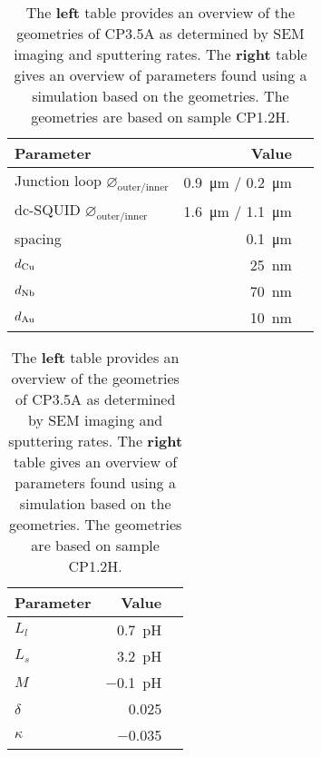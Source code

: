 \begin{table}
	\begin{subtable}{.6\linewidth}
		\begin{tabular}[t]{@{}lrr@{}}
			\toprule
			Parameter & Value \\ \midrule
			Junction loop $\diameter_{\text{outer/inner}}$ & \qty{0.9}{\micro\meter} / \qty{0.2}{\micro\meter} \\
			dc-SQUID $\diameter_{\text{outer/inner}}$ & \qty{1.6}{\micro\meter} / \qty{1.1}{\micro\meter} \\
			spacing & \qty{0.1}{\micro\meter} \\
			$d_{\ce{Cu}}$ & \qty{25}{\nano\meter} \\
			$d_{\ce{Nb}}$ & \qty{70}{\nano\meter} \\
			$d_{\ce{Au}}$ & \qty{10}{\nano\meter} \\
			\bottomrule
		\end{tabular}
    \end{subtable}
    \hfill
    \begin{subtable}{.3\linewidth}
    	\flushright
    	\begin{tabular}[t]{@{}lrr@{}}
    		\toprule
    		Parameter & Value \\ \midrule
    		$L_{l}$ & \qty{0.7}{\pico\henry} \\
			$L_{s}$ & \qty{3.2}{\pico\henry} \\
			$M$ & \qty{-0.1}{\pico\henry} \\
			$\delta$ & \num{0.025} \\
			$\kappa$ & \num{-0.035} \\
    		\bottomrule
    	\end{tabular}
    \end{subtable}
    \caption{The \textbf{left} table provides an overview of the geometries of CP3.5A as determined by SEM imaging and sputtering rates. The \textbf{right} table gives an overview of parameters found using a simulation based on the geometries. The geometries are based on sample CP1.2H.}
    \label{tab:CP3.5A-geometries}
\end{table}